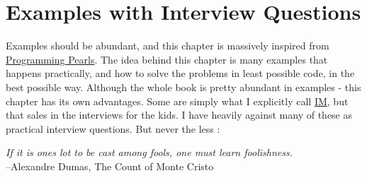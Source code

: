 \chapter{Examples with Interview Questions}\label{examples}

{\LARGE E}xamples should be abundant, and this chapter is massively inspired from \href{http://www.amazon.com/Programming-Pearls-2nd-Edition-Bentley/dp/0201657880}{Programming Pearls}. The idea behind this chapter is many examples that happens practically, 
and how to solve the problems in least possible code, in the best possible way.
Although the whole book is pretty abundant in examples - this chapter has its own advantages.
Some are simply what I explicitly call \href{http://www.urbandictionary.com/define.php?term=intellectual+masturbation}{IM}, 
but that sales in the interviews for the kids. 
I have heavily against many of these as practical interview questions. 
But never the less :

\begin{center}
\emph{If it is ones lot to be cast among fools, one must learn foolishness. }\\
   --Alexandre Dumas, The Count of Monte Cristo
\end{center}

